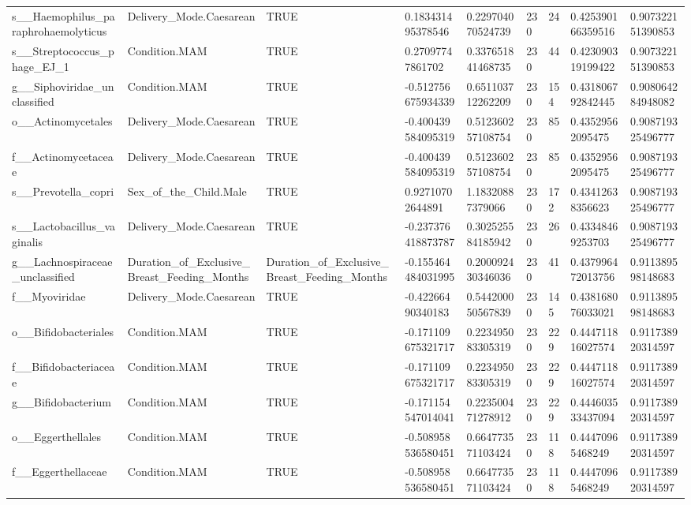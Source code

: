 \begin{longtable}{lllllllll}
s\_\_Haemophilus\_paraphrohaemolyticus & Delivery\_Mode.Caesarean & TRUE & 0.183431495378546 & 0.229704070524739 & 230 & 24 & 0.425390166359516 & 0.907322151390853 \\
s\_\_Streptococcus\_phage\_EJ\_1 & Condition.MAM & TRUE & 0.27097747861702 & 0.337651841468735 & 230 & 44 & 0.423090319199422 & 0.907322151390853 \\
g\_\_Siphoviridae\_unclassified & Condition.MAM & TRUE & -0.512756675934339 & 0.651103712262209 & 230 & 154 & 0.431806792842445 & 0.908064284948082 \\
o\_\_Actinomycetales & Delivery\_Mode.Caesarean & TRUE & -0.400439584095319 & 0.512360257108754 & 230 & 85 & 0.43529562095475 & 0.908719325496777 \\
f\_\_Actinomycetaceae & Delivery\_Mode.Caesarean & TRUE & -0.400439584095319 & 0.512360257108754 & 230 & 85 & 0.43529562095475 & 0.908719325496777 \\
s\_\_Prevotella\_copri & Sex\_of\_the\_Child.Male & TRUE & 0.92710702644891 & 1.18320887379066 & 230 & 172 & 0.43412638356623 & 0.908719325496777 \\
s\_\_Lactobacillus\_vaginalis & Delivery\_Mode.Caesarean & TRUE & -0.237376418873787 & 0.302525584185942 & 230 & 26 & 0.43348469253703 & 0.908719325496777 \\
g\_\_Lachnospiraceae\_unclassified & Duration\_of\_Exclusive\_Breast\_Feeding\_Months & Duration\_of\_Exclusive\_Breast\_Feeding\_Months & -0.155464484031995 & 0.200092430346036 & 230 & 41 & 0.437996472013756 & 0.911389598148683 \\
f\_\_Myoviridae & Delivery\_Mode.Caesarean & TRUE & -0.42266490340183 & 0.544200050567839 & 230 & 145 & 0.438168076033021 & 0.911389598148683 \\
o\_\_Bifidobacteriales & Condition.MAM & TRUE & -0.171109675321717 & 0.223495083305319 & 230 & 229 & 0.444711816027574 & 0.911738920314597 \\
f\_\_Bifidobacteriaceae & Condition.MAM & TRUE & -0.171109675321717 & 0.223495083305319 & 230 & 229 & 0.444711816027574 & 0.911738920314597 \\
g\_\_Bifidobacterium & Condition.MAM & TRUE & -0.171154547014041 & 0.223500471278912 & 230 & 229 & 0.444603533437094 & 0.911738920314597 \\
o\_\_Eggerthellales & Condition.MAM & TRUE & -0.508958536580451 & 0.664773571103424 & 230 & 118 & 0.44470965468249 & 0.911738920314597 \\
f\_\_Eggerthellaceae & Condition.MAM & TRUE & -0.508958536580451 & 0.664773571103424 & 230 & 118 & 0.44470965468249 & 0.911738920314597 \\

\end{longtable}

